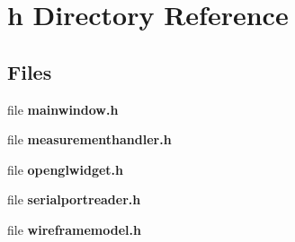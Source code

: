 \section{h Directory Reference}
\label{dir_c3a3ee36a1e03ad614258ece27f46d29}
\subsection*{Files}
\begin{DoxyCompactItemize}
\item 
file \textbf{ mainwindow.\+h}
\item 
file \textbf{ measurementhandler.\+h}
\item 
file \textbf{ openglwidget.\+h}
\item 
file \textbf{ serialportreader.\+h}
\item 
file \textbf{ wireframemodel.\+h}
\end{DoxyCompactItemize}
